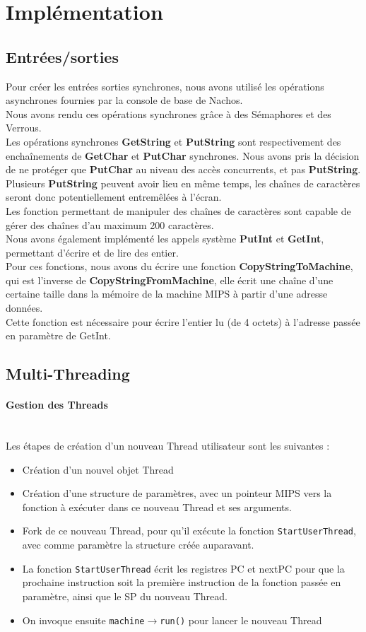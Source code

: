 \documentclass{report}
\newcommand{\myparagraph}[1]{\paragraph*{#1}\mbox{}\\}
\begin{document}
\section*{Implémentation}
\subsection*{Entrées/sorties}

Pour créer les entrées sorties synchrones, nous avons utilisé les opérations asynchrones fournies par la console de base de Nachos.\\
Nous avons rendu ces opérations synchrones grâce à des Sémaphores et des Verrous.\\
Les opérations synchrones \textbf{GetString} et \textbf{PutString} sont respectivement des enchaînements de \textbf{GetChar} et \textbf{PutChar} synchrones.
Nous avons pris la décision de ne protéger que \textbf{PutChar} au niveau des accès concurrents, et pas \textbf{PutString}. Plusieurs \textbf{PutString} peuvent avoir lieu en même temps, les chaînes de caractères seront donc potentiellement entremêlées à l'écran.\\
Les fonction permettant de manipuler des chaînes de caractères sont capable de gérer des chaînes d'au maximum 200 caractères.\\

Nous avons également implémenté les appels système \textbf{PutInt} et \textbf{GetInt}, permettant d'écrire et de lire des entier.\\
Pour ces fonctions, nous avons du écrire une fonction \textbf{CopyStringToMachine}, qui est l'inverse de \textbf{CopyStringFromMachine}, elle écrit une chaîne d'une certaine taille dans la mémoire de la machine MIPS à partir d'une adresse données.\\
Cette fonction est nécessaire pour écrire l'entier lu (de 4 octets) à l'adresse passée en paramètre de GetInt.
\subsection*{Multi-Threading}
\myparagraph{Gestion des Threads}

\noindent
Les étapes de création d'un nouveau Thread utilisateur sont les suivantes : 
\begin{itemize}
	\item Création d'un nouvel objet Thread
	\item Création d'une structure de paramètres, avec un pointeur MIPS vers la fonction à exécuter dans ce nouveau Thread et ses arguments.
	\item Fork de ce nouveau Thread, pour qu'il exécute la fonction \texttt{StartUserThread}, avec comme paramètre la structure créée auparavant.
	\item La fonction \texttt{StartUserThread} écrit les registres PC et nextPC pour que la prochaine instruction soit la première instruction de la fonction passée en paramètre, ainsi que le SP du nouveau Thread.
	\item On invoque ensuite \texttt{machine$\rightarrow$run()} pour lancer le nouveau Thread
\end{itemize}
\end{document}
